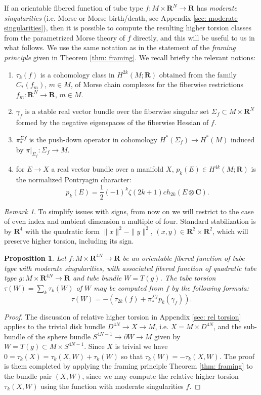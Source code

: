 \documentclass{amsart}
\def\bC{\mathbf{C}}
\def\bR{\mathbf{R}}
\newtheorem{proposition}[theorem]{Proposition}
\theoremstyle{definition}
\theoremstyle{remark}
\newtheorem{inductive lemma}[theorem]{Inductive Lemma}
\newtheorem{remark}[theorem]{Remark}
\begin{document}
If an orientable fibered function of tube type $f:M \times \bR^{N} \to \bR$ has {\em moderate singularities} (i.e. Morse or Morse birth/death, see Appendix \ref{sec: moderate singularities}), then it is possible to compute the resulting higher torsion classes from the parametrized Morse theory of $f$ directly, and this will be useful to us in what follows. We use the same notation as in the statement of the {\em framing principle} given in Theorem \ref{thm: framing}. We recall briefly the relevant notions:
\begin{enumerate}
\item $\tau_k(f)$ is a cohomology class in $H^{2k}(M;\bR)$ obtained from the family $C_*(f_m)$, $m \in M$, of Morse chain complexes for the fiberwise restrictions $f_m: \bR^{N} \to \bR$, $m \in M$.
\item $\gamma_f$ is a stable real vector bundle over the fiberwise singular set $\Sigma_f \subset M \times \bR^{N}$ formed by the negative eigenspaces of the fiberwise Hessian of $f$. 
\item $\pi_*^{\Sigma f}$ is the push-down operator in cohomology $H^*(\Sigma_f) \to H^*(M)$ induced by $\pi|_{\Sigma_f} : \Sigma_f \to M$.
\item for $E \to X$ a real vector bundle over a manifold $X$, $p_k(E)  \in H^{4k}(M;\bR)$ is the normalized Pontryagin character:
$$p_k(E) = \frac{1}{2}(-1)^k  \zeta(2k+1)ch_{2k}(E\otimes \bC) .$$
\end{enumerate}

\begin{remark}
To simplify issues with signs, from now on we will restrict to the case of even index and ambient dimension a multiple of four. Standard stabilization is by $\bR^4$ with the quadratic form $\|x\|^2-\|y\|^2$, $(x,y) \in \bR^2 \times \bR^2$, which will preserve higher torsion, including its sign. 
\end{remark}

\begin{proposition}\label{prop: stab framing}
Let $f:M \times \bR^{4N} \to \bR$ be an orientable fibered function of tube type with moderate singularities, with associated fibered function of quadratic tube type $g:M \times \bR^{4N} \to \bR$ and tube bundle $W=T(g)$. The tube torsion $\tau(W) = \sum_k \tau_k(W)$ of $W$ may be computed from $f$ by the following formula: 
$$\tau(W) =    -\left(\tau_{2k}(f)  +   \pi_*^{\Sigma f} p_k(\gamma_f)\right).$$
\end{proposition}

\begin{proof}
The discussion of relative higher torsion in Appendix \ref{sec: rel torsion} applies to the trivial disk bundle $D^{4N} \to X \to M$, i.e. $X=M \times D^{4N}$, and the sub-bundle of the sphere bundle $S^{4N-1} \to \partial W \to M$ given by $W = T(g) \subset M \times S^{4N-1}$. Since $X$ is trivial we have $0 = \tau_k(X) = \tau_k(X,W) + \tau_k(W)$ so that $\tau_k(W) = - \tau_k(X,W)$. The proof is them completed by applying the framing principle Theorem \ref{thm: framing} to the bundle pair $(X,W)$, since we may compute the relative higher torsion $\tau_k(X,W)$ using the function with moderate singularities $f$. 
\end{proof}
\end{document}
